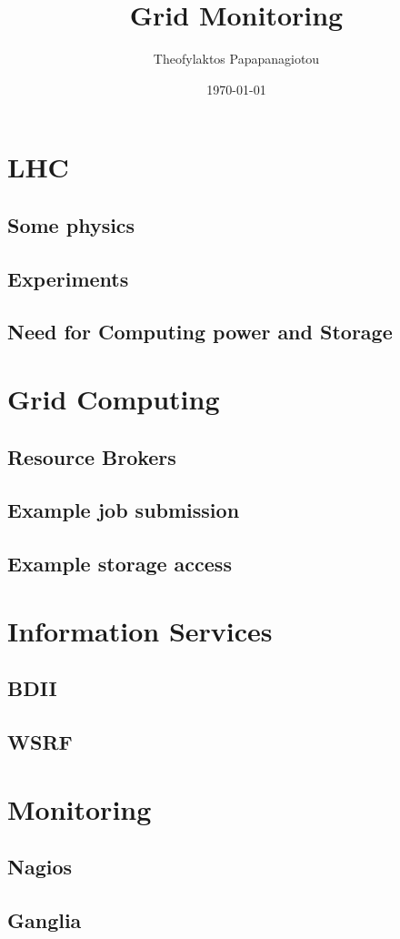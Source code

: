 \documentclass{beamer}
\begin{document}
\title{Grid Monitoring}
\author{Theofylaktos Papapanagiotou}
\subject{Grid Computing}
\date{\today}

\frame{\titlepage}




\section{LHC}
\subsection{Some physics}
\frame{}
\subsection{Experiments}
\frame{}
\subsection{Need for Computing power and Storage}
\frame{}

\section{Grid Computing}
\subsection{Resource Brokers}
\frame{}
\subsection{Example job submission}
\frame{}
\subsection{Example storage access}
\frame{}

\section{Information Services}
\subsection{BDII}
\frame{}
\subsection{WSRF}
\frame{}

\section{Monitoring}
\subsection{Nagios}
\frame{}
\subsection{Ganglia}
\end{document}
